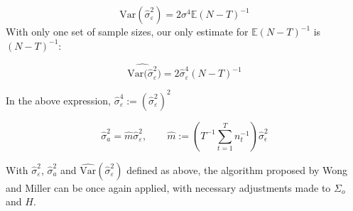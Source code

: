 $$ \text{Var}(\hat{\sigma}_\varepsilon^2) = 2\sigma^4\mathbb{E}(N-T)^{-1} $$
With only one set of sample sizes, our only estimate for $\mathbb{E}(N-T)^{-1}$ is $(N-T)^{-1}$:


$$\widehat{\text{Var}(\hat{\sigma}_\varepsilon^2}) = 2\hat{\sigma}_\varepsilon^4{(N-T)^{-1}}$$

In the above expression, $\hat{\sigma}_\varepsilon^4:= (\hat{\sigma}_\varepsilon^2)^2$

\begin{equation}
    \hat{\sigma}_a^2 =  \hat{m}\hat{\sigma}_\varepsilon^2, \qquad \hat{m}:=\left(T^{-1}\sum_{t=1}^Tn_t^{-1}\right)\hat{\sigma}_\epsilon^2 
    \label{eq:m_hat}
\end{equation} 

With $\hat{\sigma}_\varepsilon^2$, $\hat{\sigma}_a^2$ and $\hat{\text{Var}}(\hat{\sigma}_\varepsilon^2)$ defined as above, the algorithm proposed by Wong and Miller can be once again applied, with necessary adjustments made to $\Sigma_o$ and $H$. 

